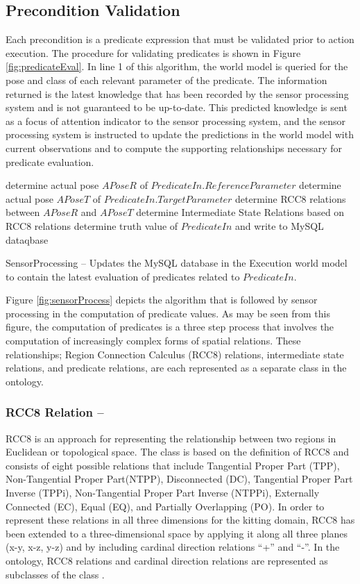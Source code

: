 \subsection{Precondition Validation}
\label{sect:preconditionValid}
Each precondition is a predicate expression that must be validated prior to
action execution.
The procedure for validating predicates is shown in Figure \ref{fig:predicateEval}. In line 1 of this algorithm, the world
model is queried for the pose and class of each relevant 
parameter of the predicate. The information returned is the 
latest knowledge that has been recorded by the sensor processing
system and is not guaranteed to be up-to-date. This predicted
knowledge is sent as a focus of attention indicator to the sensor
processing system, and the sensor processing system is instructed to
update the predictions in the world model with current observations
and to compute the supporting relationships necessary for predicate
evaluation.
%
\begin{algorithm}[h!]
 	determine actual pose $APoseR$ of $PredicateIn.ReferenceParameter$\;
 	determine actual pose $APoseT$ of $PredicateIn.TargetParameter$\;
 	determine RCC8 relations between $APoseR$ and $APoseT$\;
 	determine Intermediate State Relations based on RCC8 relations\;
 	determine truth value of $PredicateIn$ and write to MySQL dataqbase\;
\caption{{\sc SensorProcessing} -- Updates the MySQL database in the Execution world model
to contain the latest evaluation of predicates related to $PredicateIn$.}
\label{fig:sensorProcess}
\end{algorithm}
%
Figure \ref{fig:sensorProcess} depicts the algorithm that is followed by
sensor processing in the computation of predicate values. As may be seen from this
figure, the computation of predicates is a three step process that involves
the computation of increasingly complex forms of spatial relations. These
relationships; Region Connection Calculus (RCC8) relations, intermediate state relations, and predicate relations, are each represented as a separate class in
the ontology.
%
\subsubsection{RCC8 Relation --}
RCC8 \cite{Wolter2000} is an approach for representing the relationship between two regions in Euclidean or topological space. The class  
is based on the definition of RCC8 and consists of eight possible relations that include Tangential Proper Part (TPP), Non-Tangential Proper Part(NTPP), Disconnected (DC), Tangential Proper Part Inverse (TPPi), Non-Tangential Proper Part Inverse (NTPPi), Externally Connected (EC), Equal (EQ), and Partially Overlapping (PO). In order to represent these relations in all three dimensions for the kitting domain, RCC8 has been extended to a three-dimensional space by applying it along all three planes (x-y, x-z, y-z) and by including cardinal direction relations ``+'' and ``-''. In the ontology, RCC8 relations and cardinal direction relations are represented as subclasses of the class . 
%
